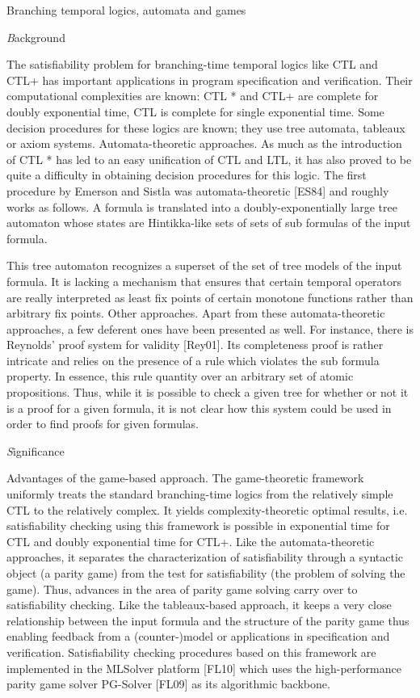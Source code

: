 \documentclass[10pt,a4paper]{report}
\begin{document}
\begin{center}
Branching temporal logics, automata and games
\end{center} 
\begin{center}
\emph Background
\end{center} 
\par The satisfiability problem for branching-time temporal logics like CTL and CTL+ has
important applications in program specification and verification. Their computational
complexities are known: CTL * and CTL+ are complete for doubly exponential time, CTL is
complete for single exponential time. Some decision procedures for these logics are known;
they use tree automata, tableaux or axiom systems.
Automata-theoretic approaches. As much as the introduction of CTL * has led to an easy
unification of CTL and LTL, it has also proved to be quite a difficulty in obtaining decision
procedures for this logic. The first procedure by Emerson and Sistla was automata-theoretic
[ES84] and roughly works as follows. A formula is translated into a doubly-exponentially large
tree automaton whose states are Hintikka-like sets of sets of sub formulas of the input formula.
\par This tree automaton recognizes a superset of the set of tree models of the input formula. It
is lacking a mechanism that ensures that certain temporal operators are really interpreted
as least fix points of certain monotone functions rather than arbitrary fix points.
Other approaches. Apart from these automata-theoretic approaches, a few deferent ones
have been presented as well. For instance, there is Reynolds' proof system for validity
[Rey01]. Its completeness proof is rather intricate and relies on the presence of a rule which
violates the sub formula property. In essence, this rule quantity over an arbitrary set of
atomic propositions. Thus, while it is possible to check a given tree for whether or not it is
a proof for a given formula, it is not clear how this system could be used in order to
find proofs for given formulas.
\begin{center}
\emph Significance
\end{center} 
Advantages of the game-based approach. The game-theoretic framework uniformly treats the
standard branching-time logics from the relatively simple CTL to the relatively complex.
It yields complexity-theoretic optimal results, i.e. satisfiability checking using this framework
is possible in exponential time for CTL and doubly exponential time for CTL+.
Like the automata-theoretic approaches, it separates the characterization of satisfiability
through a syntactic object (a parity game) from the test for satisfiability (the problem
of solving the game). Thus, advances in the area of parity game solving carry over to
satisfiability checking. Like the tableaux-based approach, it keeps a very close relationship
between the input formula and the structure of the parity game thus enabling feedback from a
(counter-)model or applications in specification and verification. Satisfiability checking
procedures based on this framework are implemented in the
MLSolver platform [FL10] which uses the high-performance parity game solver PG-Solver [FL09]
as its algorithmic backbone.
\end{document}

